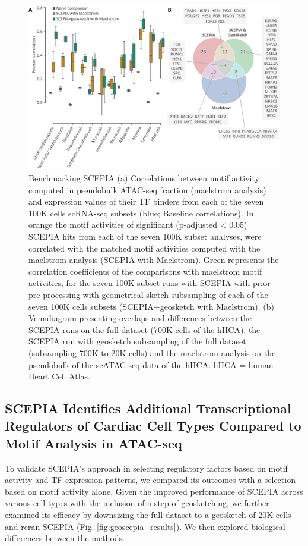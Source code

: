 \begin{figure}
    \centering
    \includegraphics[width=0.75\linewidth]{ch.scepia/imgs/Fig_OverlappingHitsBetweenSCEPIAGEOANDMAELSTROM_v7.png}
    \caption{Benchmarking SCEPIA (a) Correlations between motif activity computed in pseudobulk ATAC-seq fraction (maelstrom analysis) and expression values of their TF binders from each of the seven 100K cells scRNA-seq subsets (blue; Baseline correlations). In orange the motif activities of significant (p-adjusted < 0.05) SCEPIA hits from each of the seven 100K subset analyses, were correlated with the matched motif activities computed with the maelstrom analysis (SCEPIA with Maelstrom). Green represents the correlation coefficients of the comparisons with maelstrom motif activities, for the seven 100K subset runs with SCEPIA with prior pre-processing with geometrical sketch subsampling of each of the seven 100K cells subsets (SCEPIA+geosketch with Maelstrom). (b) Venndiagram presenting overlaps and differences between the SCEPIA runs on the full dataset (700K cells of the hHCA), the SCEPIA run with geosketch subsampling of the full dataset (subsampling 700K to 20K cells) and the maelstrom analysis on the pseudobulk of the scATAC-seq data of the hHCA. hHCA = human Heart Cell Atlas.}
    \label{fig:sc_benchmark}
\end{figure}

\subsection{SCEPIA Identifies Additional Transcriptional Regulators of Cardiac Cell Types Compared to Motif Analysis in ATAC-seq} 

To validate SCEPIA's approach in selecting regulatory factors based on motif activity and TF expression patterns, we compared its outcomes with a selection based on motif activity alone. Given the improved performance of SCEPIA across various cell types with the inclusion of a step of geosketching, we further examined its efficacy by downsizing the full dataset to a geosketch of 20K cells and reran SCEPIA (Fig. \ref{fig:geoscepia_results}). We then explored biological differences between the methods.

